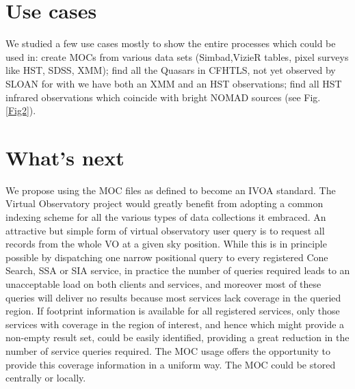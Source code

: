 \documentclass[11pt,twoside]{article}
\begin{document}
\section{Use cases}
We studied a few use cases mostly to show the entire processes which could be used in: create MOCs from various data sets (Simbad,VizieR tables, pixel surveys like HST, SDSS, XMM); find all the Quasars in CFHTLS, not yet observed by SLOAN for with we have both an XMM and an HST observations; find all HST infrared observations which coincide with bright NOMAD sources (see Fig. \ref{Fig2}).


\section{What's next}

We propose using the MOC files as defined to become an IVOA standard. 
The Virtual Observatory project would greatly benefit from adopting a common indexing scheme for all the various types of data collections it embraced. 
An attractive but simple form of virtual observatory user query is
to request all records from the whole VO at a given sky position.
While this is in principle possible by dispatching one narrow
positional query to every registered Cone Search, SSA or SIA service,
in practice the number of queries required leads to an unacceptable
load on both clients and services, and moreover most of these queries
will deliver no results because most services lack coverage in the
queried region. If footprint information is available for all registered services, only those
services with coverage in the region of interest, and hence which
might provide a non-empty result set, could be easily identified,
providing a great reduction in the number of service queries required.
The MOC usage offers the opportunity to provide
this coverage information in a uniform way. The MOC could be stored centrally or locally.


\end{document}
